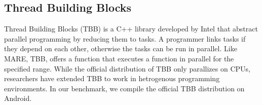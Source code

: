 
\subsection{Thread Building Blocks}


Thread Building Blocks (TBB) is a C++ library developed by Intel that abstract parallel programming
    by reducing them to tasks.
A programmer links tasks if they depend on each other, otherwise the tasks can be run in parallel.
Like MARE, TBB, offers a  function that executes a function in parallel for the specified range.
While the official distribution of TBB only parallizes on CPUs, researchers have extended TBB to work
    in hetrogenous programming environments.
In our benchmark, we compile the official TBB distribution on Android.